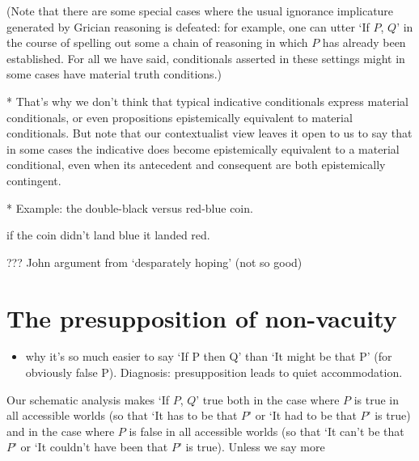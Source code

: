 \documentclass[If.tex]{subfiles}
\begin{document}
(Note that there are some special cases where the usual ignorance implicature generated by Grician reasoning is defeated: for example, one can utter ‘If $P$, $Q$’ in the course of spelling out some a chain of reasoning in which $P$ has already been established.  For all we have said, conditionals asserted in these settings might in some cases have material truth conditions.)



* That's why we don't think that typical indicative conditionals express material conditionals, or even propositions epistemically equivalent to material conditionals.  But note that our contextualist view leaves it open to us to say that in some cases the indicative does become epistemically equivalent to a material conditional, even when its antecedent and consequent are both epistemically contingent.  

* Example: the double-black versus red-blue coin.  
\begin{prop}
	 if the coin didn't land blue it landed red.
\end{prop}
??? John argument from ‘desparately hoping’ (not so good)


\section{The presupposition of non-vacuity}
\label{sect:nonvacuity}
\begin{itemize} 
	\item
	why it's so much easier to say ‘If P then Q’ than ‘It might be that P’ (for obviously false P). Diagnosis: presupposition leads to quiet accommodation.
\end{itemize}

Our schematic analysis makes ‘If $P$, $Q$’ true both in the case where $P$ is true in all accessible worlds (so that ‘It has to be that $P$’ or ‘It had to be that $P$’ is true) and in the case where $P$ is false in all accessible worlds (so that ‘It can't be that $P$’ or ‘It couldn't have been that $P$’ is true).  Unless we say more
\end{document}
